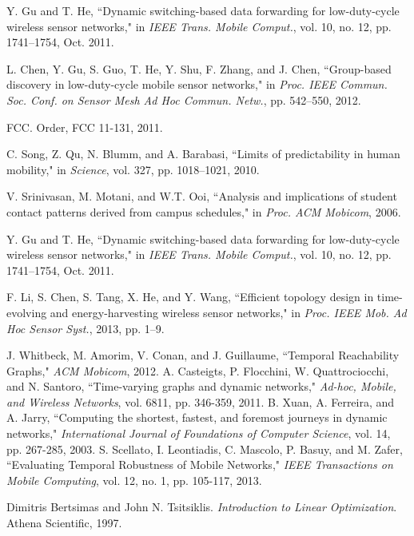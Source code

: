\documentclass[10pt, conference, letterpaper]{IEEEtran}
\begin{document}
\begin{thebibliography}{1}
 Y. Gu and T. He, ``Dynamic switching-based data forwarding for low-duty-cycle wireless sensor networks," in \emph{IEEE Trans. Mobile Comput.}, vol. 10, no. 12, pp. 1741–1754, Oct. 2011.

 L. Chen, Y. Gu, S. Guo, T. He, Y. Shu, F. Zhang, and J. Chen, ``Group-based discovery in low-duty-cycle mobile sensor
networks," in \emph{Proc. IEEE Commun. Soc. Conf. on Sensor Mesh Ad Hoc Commun. Netw.}, pp. 542–550, 2012.

 FCC. Order, FCC 11-131, 2011.

 C. Song, Z. Qu, N. Blumm, and A. Barabasi, ``Limits of predictability in human mobility," in \emph{Science}, vol. 327, pp. 1018–1021, 2010.

 V. Srinivasan, M. Motani, and W.T. Ooi, ``Analysis and implications of student contact patterns derived from campus schedules," in \emph{Proc. ACM Mobicom}, 2006.

 Y. Gu and T. He, ``Dynamic switching-based data forwarding for low-duty-cycle wireless sensor networks," in \emph{IEEE Trans. Mobile Comput.}, vol. 10, no. 12, pp. 1741–1754, Oct. 2011.

 F. Li, S. Chen, S. Tang, X. He, and Y. Wang, ``Efficient topology design in time-evolving and energy-harvesting wireless sensor networks," in \emph{Proc. IEEE Mob. Ad Hoc Sensor Syst.}, 2013, pp. 1–9.


 J. Whitbeck, M. Amorim, V. Conan, and J. Guillaume, ``Temporal Reachability Graphs,"  \emph{ACM Mobicom}, 2012.
 A. Casteigts, P. Flocchini, W. Quattrociocchi, and N. Santoro, ``Time-varying graphs and dynamic networks,"  \emph{Ad-hoc, Mobile, and Wireless Networks}, vol. 6811, pp. 346-359, 2011.
 B. Xuan, A. Ferreira, and A. Jarry, ``Computing the shortest, fastest, and foremost journeys in dynamic networks,"  \emph{International Journal of Foundations of Computer Science}, vol. 14, pp. 267-285, 2003.
  S. Scellato, I. Leontiadis, C. Mascolo, P. Basuy, and M. Zafer, ``Evaluating Temporal Robustness of Mobile Networks,"  \emph{IEEE Transactions on Mobile Computing}, vol. 12,  no. 1, pp. 105-117, 2013.


 Dimitris Bertsimas and John N. Tsitsiklis. \emph{Introduction to Linear Optimization}. Athena Scientific, 1997.


\end{thebibliography}
\end{document}
